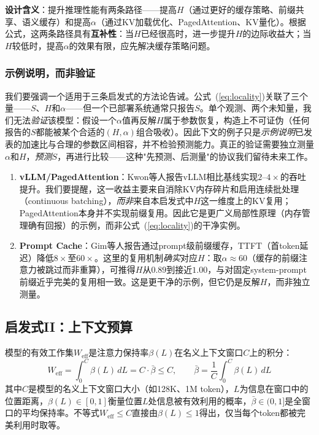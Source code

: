 \textbf{设计含义}：提升推理性能有两条路径——提高$H$（通过更好的缓存策略、前缀共享、语义缓存\cite{gim2024promptcache}）和提高$\alpha$（通过KV加载优化、PagedAttention\cite{kwon2023pagedattention}、KV量化\cite{hooper2024kvquant}）。根据公式，这两条路径具有\textbf{互补性}：当$H$已经很高时，进一步提升$H$的边际收益大；当$H$较低时，提高$\alpha$的效果有限，应先解决缓存策略问题。

\subsubsection{示例说明，而非验证}

我们要强调一个适用于三条启发式的方法论告诫。公式~(\ref{eq:locality})关联了三个量——$S$、$H$和$\alpha$——但一个已部署系统通常只报告$S$。单个观测、两个未知量，我们无法\emph{验证}该模型：假设一个$\alpha$值再反解$H$属于参数恢复，构造上不可证伪（任何报告的$S$都能被某个合适的$(H,\alpha)$组合吸收）。因此下文的例子只是\emph{示例说明}已发表的加速比与合理的参数区间相容，并不检验预测能力。真正的验证需要独立测量$\alpha$和$H$，\emph{预测}$S$，再进行比较——这种"先预测、后测量"的协议我们留待未来工作。

\begin{enumerate}[nosep]
\item \textbf{vLLM/PagedAttention}：Kwon等人报告vLLM相比基线实现$2$--$4\times$的吞吐提升\cite{kwon2023pagedattention}。我们要提醒，这一收益主要来自消除KV内存碎片和启用连续批处理（continuous batching），\emph{而非}来自本启发式中$H$这一维度上的KV复用；PagedAttention本身并不实现前缀复用。因此它是更广义局部性原理（内存管理确有回报）的示例，而非公式~(\ref{eq:locality})的干净实例。

\item \textbf{Prompt Cache}：Gim等人报告通过prompt级前缀缓存，TTFT（首token延迟）降低$8\times$至$60\times$\cite{gim2024promptcache}。这里的复用机制\emph{确实}对应$H$：取$\alpha \approx 60$（缓存的前缀注意力被跳过而非重算），可推得$H$从$0.89$到接近$1.00$，与对固定system-prompt前缀近乎完美的复用相一致。这是更干净的示例，但它仍是反解$H$，而非独立测量。
\end{enumerate}

\subsection{启发式II：上下文预算}
\label{sec:law2}

\begin{heuristic}[上下文预算]
模型的有效工作集$W_{\mathrm{eff}}$是注意力保持率$\beta(L)$在名义上下文窗口$C$上的积分：
\begin{equation}
\label{eq:context}
W_{\mathrm{eff}} = \int_0^C \beta(L)\,dL = C \cdot \bar{\beta} \leq C, \qquad \bar{\beta} = \frac{1}{C}\int_0^C \beta(L)\,dL
\end{equation}
其中$C$是模型的名义上下文窗口大小（如128K、1M token），$L$为信息在窗口中的位置距离，$\beta(L) \in [0,1]$衡量位置$L$处信息被有效利用的概率，$\bar{\beta} \in (0,1]$是全窗口的平均保持率。不等式$W_{\mathrm{eff}} \leq C$直接由$\beta(L) \leq 1$得出，仅当每个token都被完美利用时取等。
\end{heuristic}

